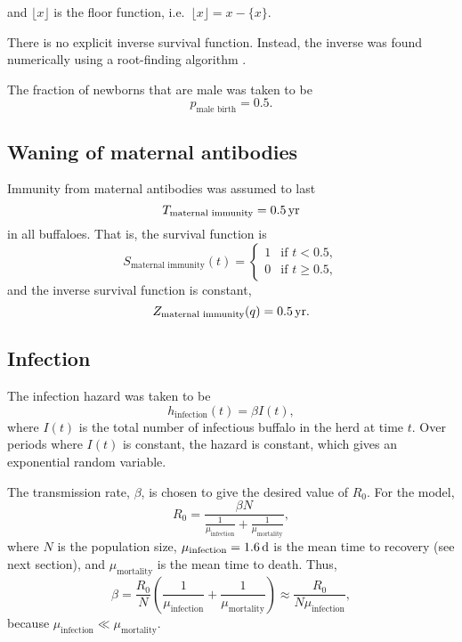 \documentclass{jpmarticle}
\begin{document}
and $\lfloor x \rfloor$ is the floor function,
i.e.~$\lfloor x \rfloor = x - \{x\}$.

There is no explicit inverse survival function.  Instead, the inverse
was found numerically using a root-finding algorithm \citep{scipy}.

The fraction of newborns that are male was taken to be
\begin{equation}
  p_{\text{male birth}} = 0.5.
\end{equation}


\subsection{Waning of maternal antibodies}

Immunity from maternal antibodies was assumed to last
\begin{equation}
  T_{\text{maternal immunity}} = \unit[0.5]{yr}
\end{equation}
in all buffaloes.  That is, the survival function is
\begin{equation}
  S_{\text{maternal immunity}}(t) =
  \begin{cases}
    1 & \text{if $t < 0.5$},
    \\
    0 & \text{if $t \geq 0.5$},
  \end{cases}
\end{equation}
and the inverse survival function is constant,
\begin{equation}
  Z_{\text{maternal immunity}}(q) = \unit[0.5]{yr}.
\end{equation}


\subsection{Infection}

The infection hazard was taken to be
\begin{equation}
  h_{\text{infection}}(t) = \beta I(t),
\end{equation}
where $I(t)$ is the total number of infectious buffalo in the herd at
time $t$.  Over periods where $I(t)$ is constant, the hazard is
constant, which gives an exponential random variable.

The transmission rate, $\beta$, is chosen to give the desired value of
$R_0$.  For the model,
\begin{equation}
  R_0 = \frac{\beta N}{\frac{1}{\mu_{\text{infection}}}
    + \frac{1}{\mu_{\text{mortality}}}},
\end{equation}
where $N$ is the population size,
$\mu_{\text{infection}} = \unit[1.6]{d}$ is the mean time to recovery
(see next section), and $\mu_{\text{mortality}}$ is the mean time to
death.  Thus,
\begin{equation}
  \beta = \frac{R_0}{N}
  \left(\frac{1}{\mu_{\text{infection}}} +
    \frac{1}{\mu_{\text{mortality}}}\right)
  \approx \frac{R_0}{N \mu_{\text{infection}}},
\end{equation}
because $\mu_{\text{infection}} \ll \mu_{\text{mortality}}$.
\end{document}
